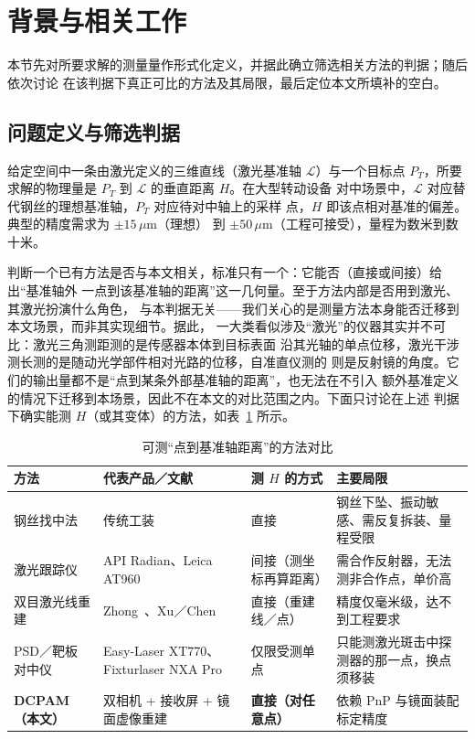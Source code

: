\section{背景与相关工作}
\label{sec:related}

本节先对所要求解的测量量作形式化定义，并据此确立筛选相关方法的判据；随后依次讨论
在该判据下真正可比的方法及其局限，最后定位本文所填补的空白。

\subsection{问题定义与筛选判据}

给定空间中一条由激光定义的三维直线（激光基准轴 $\mathcal{L}$）与一个目标点
$P_T$，所要求解的物理量是 $P_T$ 到 $\mathcal{L}$ 的垂直距离 $H$。在大型转动设备
对中场景中，$\mathcal{L}$ 对应替代钢丝的理想基准轴，$P_T$ 对应待对中轴上的采样
点，$H$ 即该点相对基准的偏差。典型的精度需求为 $\pm15\,\mu\mathrm{m}$（理想）
到 $\pm50\,\mu\mathrm{m}$（工程可接受），量程为数米到数十米。

判断一个已有方法是否与本文相关，标准只有一个：它能否（直接或间接）给出“基准轴外
一点到该基准轴的距离”这一几何量。至于方法内部是否用到激光、其激光扮演什么角色，
与本判据无关——我们关心的是测量方法本身能否迁移到本文场景，而非其实现细节。据此，
一大类看似涉及“激光”的仪器其实并不可比：激光三角测距测的是传感器本体到目标表面
沿其光轴的单点位移，激光干涉测长测的是随动光学部件相对光路的位移，自准直仪测的
则是反射镜的角度。它们的输出量都不是“点到某条外部基准轴的距离”，也无法在不引入
额外基准定义的情况下迁移到本场景，因此不在本文的对比范围之内。下面只讨论在上述
判据下确实能测 $H$（或其变体）的方法，如表~\ref{tab:compare} 所示。

\begin{table}[!t]
\centering
\caption{可测“点到基准轴距离”的方法对比}
\label{tab:compare}
\begin{tabular}{@{}p{2.6cm}p{3.0cm}p{2.4cm}p{4.2cm}@{}}
\toprule
方法 & 代表产品／文献 & 测 $H$ 的方式 & 主要局限 \\
\midrule
钢丝找中法 & 传统工装~\cite{wire_alignment} &
直接 & 钢丝下坠、振动敏感、需反复拆装、量程受限 \\
激光跟踪仪 & API Radian、Leica AT960~\cite{api_radian,leica_at960} &
间接（测坐标再算距离） & 需合作反射器，无法测非合作点，单价高 \\
双目激光线重建 & Zhong~\cite{zhong2021line3d}、Xu／Chen~\cite{xu2017ortho,chen2021vision2cam} &
直接（重建线／点） & 精度仅毫米级，达不到工程要求 \\
PSD／靶板对中仪 & Easy-Laser XT770、Fixturlaser NXA Pro~\cite{easylaser_xt770,fixturlaser_nxa} &
仅限受测单点 & 只能测激光斑击中探测器的那一点，换点须移装 \\
\textbf{DCPAM（本文）} & 双相机 + 接收屏 + 镜面虚像重建 &
\textbf{直接（对任意点）} & 依赖 PnP 与镜面装配标定精度 \\
\bottomrule
\end{tabular}
\end{table}

